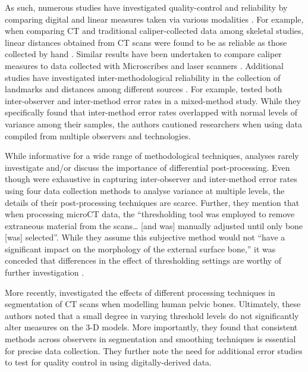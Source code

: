 \documentclass[review]{elsarticle}
\begin{document}
As such, numerous studies have investigated quality-control and reliability by comparing digital and linear measures taken via various modalities \citep{RN11474,RN11475,RN11476}. For example, when comparing CT and traditional caliper-collected data among skeletal studies, linear distances obtained from CT scans were found to be as reliable as those collected by hand \citep{RN5894,RN5893,RN5895,RN5896,zonn1989}. Similar results have been undertaken to compare caliper measures to data collected with Microscribes \citep{RN11487,RN11475} and laser scanners \citep{RN5886}. Additional studies have investigated inter-methodological reliability in the collection of landmarks and distances among different sources \citep{RN5879,RN5892,RN11522,RN5897,RN5901}. For example, \citet{RN11945} tested both inter-observer and inter-method error rates in a mixed-method study. While they specifically found that inter-method error rates overlapped with normal levels of variance among their samples, the authors cautioned researchers when using data compiled from multiple observers and technologies. 

While informative for a wide range of methodological techniques, analyses rarely investigate and/or discuss the importance of differential post-processing. Even though \citet[64]{RN11945} were exhaustive in capturing inter-observer and inter-method error rates using four data collection methods to analyse variance at multiple levels, the details of their post-processing techniques are scarce. Further, they mention that when processing microCT data, the “thresholding tool was employed to remove extraneous material from the scans… [and was] manually adjusted until only bone [was] selected”. While they assume this subjective method would not “have a significant impact on the morphology of the external surface bone,” it was conceded that differences in the effect of thresholding settings are worthy of further investigation \citep[64]{RN11945}.

More recently, \citet{RN8984} investigated the effects of different processing techniques in segmentation of CT scans when modelling human pelvic bones. Ultimately, these authors noted that a small degree in varying threshold levels do not significantly alter measures on the 3-D models. More importantly, they found that consistent methods across observers in segmentation and smoothing techniques is essential for precise data collection. They further note the need for additional error studies to test for quality control in using digitally-derived data.
\end{document}
